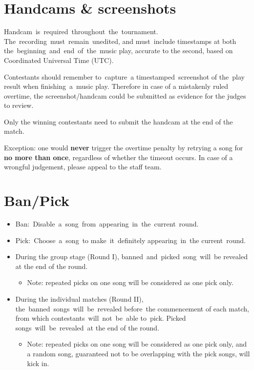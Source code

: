 \documentclass{article}
\newcommand{\alert}[1]{{\color{red} #1}}
\begin{document}
\section{Handcams \& screenshots}

Handcam is required throughout the tournament.
The recording must remain unedited,
and must include timestamps
at both the beginning and end of the music play,
accurate to the second,
based on Coordinated Universal Time (UTC).

Contestants should remember to capture a timestamped screenshot
of the play result
when finishing a music play.
Therefore in case of a mistakenly ruled overtime,
the screenshot/handcam could be
submitted as evidence for the judges to review.

Only the winning contestants need to submit the handcam
at the end of the match.

Exception: one would \textbf{never}
trigger the overtime penalty
by retrying a song
for \textbf{no more than once},
regardless of whether the timeout occurs.
In case of a wrongful judgement,
please appeal to the staff team.

\section{Ban/Pick}

\begin{itemize}
	\item Ban: Disable a song from appearing in the current round.

	\item Pick: Choose a song to make it definitely
	      appearing in the current round.  %

	\item During the group stage (Round I),
	      banned and picked song will be revealed
	      at the end of the round.
	      \begin{itemize}
		      \item \alert{
			            Note: repeated picks on one
			            song will be considered as one pick only.
		            }
	      \end{itemize}

	\item During the individual matches (Round II),
	      the banned songs will be revealed before the commencement of each match,
	      from which contestants will not be able to pick.
	      Picked songs will be revealed at the end of the round.
	      \begin{itemize}
		      \item \alert{
			            Note: repeated picks on one
			            song will be considered as one pick only,
			            and a random song,
			            guaranteed not to be
			            overlapping with the pick songs,
			            will kick in.  %
		            }
	      \end{itemize}
\end{itemize}
\end{document}
